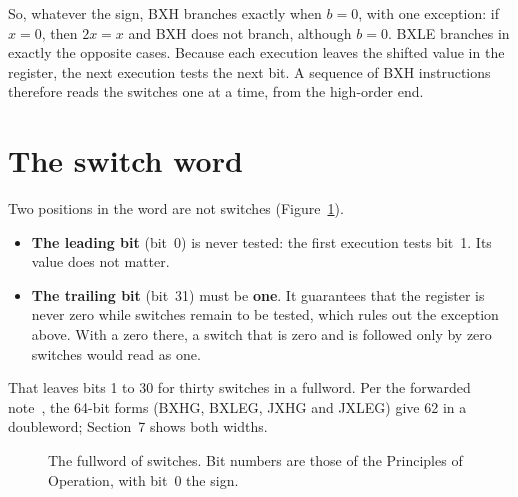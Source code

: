 \documentclass[11pt]{article}
\newcommand{\cell}[4]{%
  \node[draw, minimum width=7mm, minimum height=7mm, fill=#4,
        font=\ttfamily\small] at (#1,#2) {#3};}
\begin{document}
So, whatever the sign, BXH branches exactly when $b = 0$, with one
exception: if $x = 0$, then $2x = x$ and BXH does not branch, although
$b = 0$. BXLE branches in exactly the opposite cases. Because each
execution leaves the shifted value in the register, the next execution tests
the next bit. A sequence of BXH instructions therefore reads the switches
one at a time, from the high-order end.

\section{The switch word}

Two positions in the word are not switches (Figure~\ref{fig:layout}).
\begin{itemize}
\item \textbf{The leading bit} (bit~0) is never tested: the first execution
  tests bit~1. Its value does not matter.
\item \textbf{The trailing bit} (bit~31) must be \textbf{one}. It guarantees
  that the register is never zero while switches remain to be tested, which
  rules out the exception above. With a zero there, a switch that is zero
  and is followed only by zero switches would read as one.
\end{itemize}
That leaves bits 1 to 30 for thirty switches in a fullword. Per the forwarded
note~\cite{metz2024}, the 64-bit forms (BXHG, BXLEG, JXHG and JXLEG) give 62
in a doubleword; Section~7 shows both widths.

\begin{figure}[ht]
\centering
{}
\caption{The fullword of switches. Bit numbers are those of the Principles of
Operation, with bit~0 the sign.}
\label{fig:layout}
\end{figure}
\end{document}
